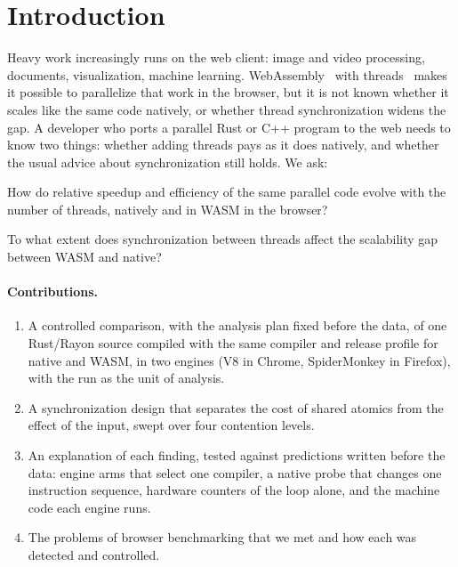 \section{Introduction}

Heavy work increasingly runs on the web client: image and video processing,
documents, visualization, machine learning. WebAssembly~\cite{haas2017}
with threads~\cite{watt2019} makes it possible to parallelize that work in
the browser, but it is
not known whether it scales like the same code natively, or whether thread
synchronization widens the gap. A developer who ports a parallel Rust or C++
program to the web needs to know two things: whether adding threads pays as
it does natively, and whether the usual advice about synchronization still
holds. We ask:

\begin{description}[leftmargin=3em]
  \item[RQ1] How do relative speedup and efficiency of the same parallel
  code evolve with the number of threads, natively and in WASM in the
  browser?
  \item[RQ2] To what extent does synchronization between threads affect the
  scalability gap between WASM and native?
\end{description}

\paragraph{Contributions.}
\begin{enumerate}[leftmargin=2em]
  \item A controlled comparison, with the analysis plan fixed before the
  data, of one Rust/Rayon source compiled with the same compiler and release
  profile for native and WASM, in two engines (V8 in Chrome, SpiderMonkey in
  Firefox), with the run as the unit of analysis.
  \item A synchronization design that separates the cost of shared atomics
  from the effect of the input, swept over four contention levels.
  \item An explanation of each finding, tested against predictions written
  before the data: engine arms that select one compiler, a native probe that
  changes one instruction sequence, hardware counters of the loop alone, and
  the machine code each engine runs.
  \item The problems of browser benchmarking that we met and how each was
  detected and controlled.
\end{enumerate}

